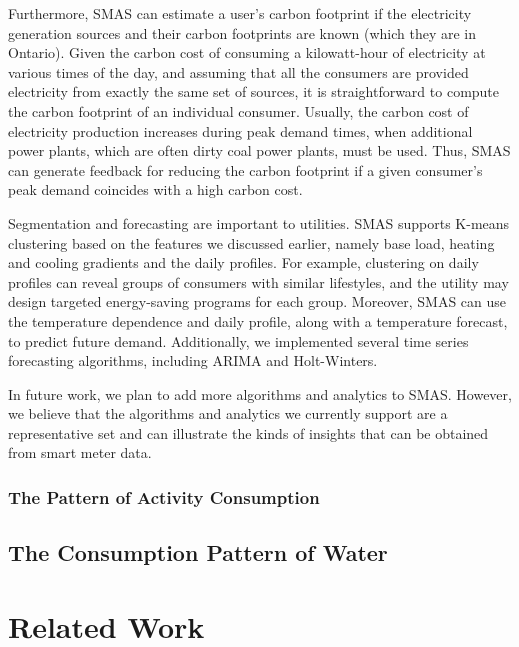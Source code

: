\documentclass{sig-alternate}
\begin{document}
Furthermore, SMAS can estimate a user's carbon footprint if the electricity generation sources and their carbon footprints are known (which they are in Ontario).  Given the carbon cost of consuming a kilowatt-hour of electricity at various times of the day, and assuming that all the consumers are provided electricity from exactly the same set of sources, it is straightforward to compute the carbon footprint of an individual consumer.  Usually, the carbon cost of electricity production increases during peak demand times, when additional power plants, which are often dirty coal power plants, must be used.  Thus, SMAS can generate feedback for reducing the carbon footprint if a given consumer's peak demand coincides with a high carbon cost. 

Segmentation and forecasting are important to utilities.  SMAS supports K-means clustering based on the features we discussed earlier, namely base load, heating and cooling gradients and the daily profiles.  For example, clustering on daily profiles can reveal groups of consumers with similar lifestyles, and the utility may design targeted energy-saving programs for each group.  Moreover, SMAS can use the temperature dependence and daily profile, along with a temperature forecast, to predict future demand.  Additionally, we implemented several time series forecasting algorithms, including ARIMA and Holt-Winters.

In future work, we plan to add more algorithms and analytics to SMAS.  However, we believe that the algorithms and analytics we currently support are a representative set and can illustrate the kinds of insights that can be obtained from smart meter data.

\subsubsection{The Pattern of Activity Consumption}

\subsection{The Consumption Pattern of Water}

\section{Related Work}
\end{document}
